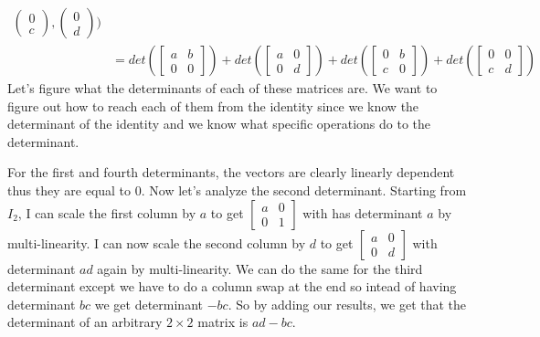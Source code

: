 \begin{example}
\begin{align*}
\begin{pmatrix}
        0 \\ c
    \end{pmatrix}, \begin{pmatrix}
        0 \\ d
    \end{pmatrix})\tag{by Multilinearity}\\
    &=det(\begin{bmatrix}
        a & b \\
        0 & 0
    \end{bmatrix})+det(\begin{bmatrix}
        a & 0 \\
        0 & d
    \end{bmatrix})+det(\begin{bmatrix}
        0 & b \\
        c & 0
    \end{bmatrix})+det(\begin{bmatrix}
        0 & 0 \\
        c & d
    \end{bmatrix})
    \end{align*}
    Let's figure what the determinants of each of these matrices are. We want to figure out how to reach each of them from the identity since we know the determinant of the identity and we know what specific operations do to the determinant. 

    For the first and fourth determinants, the vectors are clearly linearly dependent thus they are equal to $0$. Now let's analyze the second determinant. Starting from $I_2$, I can scale the first column by $a$ to get $\begin{bmatrix}
        a & 0 \\ 0 & 1
    \end{bmatrix}$ with has determinant $a$ by multi-linearity. I can now scale the second column by $d$ to get $\begin{bmatrix}
        a & 0 \\ 0 & d
    \end{bmatrix}$ with determinant $ad$ again by multi-linearity. We can do the same for the third determinant except we have to do a column swap at the end so intead of having determinant $bc$ we get determinant $-bc$. So by adding our results, we get that the determinant of an arbitrary $2\times 2$ matrix is $ad-bc$.
\end{example}
